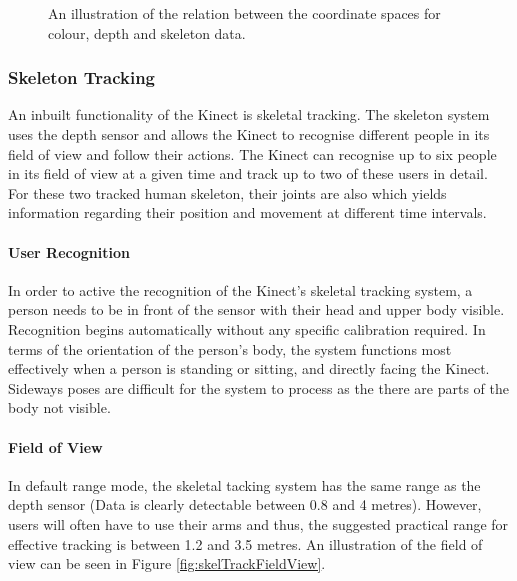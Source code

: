 \begin{figure}[ht]
	\centering
	{%
		\setlength{\fboxsep}{0pt}%
		\setlength{\fboxrule}{0.5pt}%
		}
	\caption{An illustration of the relation between the coordinate spaces for colour, depth and skeleton data. \cite{nonContact2017}}
	\label{fig:spaceConversion}
\end{figure}

\subsubsection{Skeleton Tracking} \label{kinectSkelTracking}
An inbuilt functionality of the Kinect is skeletal tracking. The skeleton system uses the depth sensor and allows the Kinect to recognise different people in its field of view and follow their actions. The Kinect can recognise up to six people in its field of view at a given time and track up to two of these users in detail. For these two tracked human skeleton, their joints are also which yields information regarding their position and movement at different time intervals. \cite{msdnSkelTrack2017}

\paragraph{User Recognition}
In order to active the recognition of the Kinect's skeletal tracking system, a person needs to be in front of the sensor with their head and upper body visible. Recognition begins automatically without any specific calibration required. In terms of the orientation of the person's body, the system functions most effectively when a person is standing or sitting, and directly facing the Kinect. Sideways poses are difficult for the system to process as the there are parts of the body not visible. \cite{msdnSkelTrack2017}

\paragraph{Field of View}
In default range mode, the skeletal tacking system has the same range as the depth sensor (Data is clearly detectable between 0.8 and 4 metres). However, users will often have to use their arms and thus, the suggested practical range for effective tracking is between 1.2 and 3.5 metres. An illustration of the field of view can be seen in Figure \ref{fig:skelTrackFieldView}.

